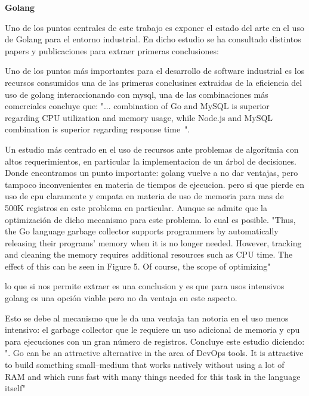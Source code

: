 

\textbf{Golang}


Uno de los puntos centrales de este trabajo es exponer el estado del arte en el uso de Golang para el entorno industrial. En dicho estudio se ha consultado distintos papers y publicaciones para extraer primeras conclusiones:

Uno de los puntos más importantes para el desarrollo de software industrial es los recursos consumidos una de las primeras conclusines extraidas de la eficiencia del uso de golang interaccionando con mysql, una de las combinaciones más comerciales concluye que: "... combination of Go and MySQL is superior regarding CPU utilization and memory usage, while Node.js and MySQL combination is superior regarding response time~\cite{Effendy20211955}".

Un estudio más centrado en el uso de recursos ante problemas de algorítmia con altos requerimientos, en particular la implementacion de un árbol de decisiones. ~\cite{Dymora20201} Donde encontramos un punto importante: golang vuelve a no dar ventajas, pero tampoco inconvenientes en materia de tiempos de ejecucion. pero si que pierde en uso de cpu claramente y empata en materia de uso de memoria para mas de 500K registros en este problema en particular. Aunque se admite que la optimización de dicho mecanismo para este problema. lo cual es posible. "Thus, the Go language garbage collector
supports programmers by automatically releasing their programs’ memory when it is no longer needed.
However, tracking and cleaning the memory requires additional resources such as CPU time. The effect
of this can be seen in Figure 5. Of course, the scope of optimizing"~\cite{Dymora20201}

lo que si nos permite extraer es una conclusion y es que para usos intensivos golang es una opción viable pero no da ventaja en este aspecto.

Esto se debe al mecanismo que le da una ventaja tan notoria en el uso menos intensivo: el garbage collector que le requiere un uso adicional de memoria y cpu para ejecuciones con un gran número de registros. Concluye este estudio diciendo: ". Go can be an
attractive alternative in the area of DevOps tools. It is attractive to build something small–medium
that works natively without using a lot of RAM and which runs fast with many things needed for
this task in the language itself"~\cite{Dymora20201}

